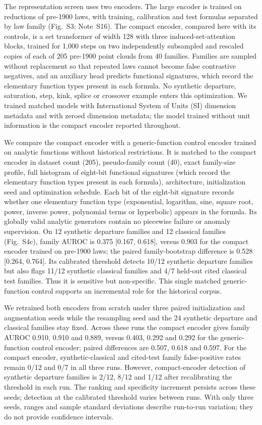 \documentclass{article}
\begin{document}
The representation screen uses two encoders. The large encoder is trained on reductions of pre-1900 laws, with training, calibration and test formulas separated by law family (Fig.~S3; Note~S16). The compact encoder, compared here with its controls, is a set transformer of width 128 with three induced-set-attention blocks, trained for 1,000 steps on two independently subsampled and rescaled copies of each of 205 pre-1900 point clouds from 40 families. Families are sampled without replacement so that repeated laws cannot become false contrastive negatives, and an auxiliary head predicts functional signatures, which record the elementary function types present in each formula. No synthetic departure, saturation, step, kink, splice or crossover example enters this optimization. We trained matched models with International System of Units (SI) dimension metadata and with zeroed dimension metadata; the model trained without unit information is the compact encoder reported throughout.

We compare the compact encoder with a generic-function control encoder trained on analytic functions without historical restrictions. It is matched to the compact encoder in dataset count (205), pseudo-family count (40), exact family-size profile, full histogram of eight-bit functional signatures (which record the elementary function types present in each formula), architecture, initialization seed and optimization schedule. Each bit of the eight-bit signature records whether one elementary function type (exponential, logarithm, sine, square root, power, inverse power, polynomial terms or hyperbolic) appears in the formula. Its globally valid analytic generators contain no piecewise failure or anomaly supervision. On 12 synthetic departure families and 12 classical families (Fig.~S4c), family AUROC is 0.375 [0.167, 0.618], versus 0.903 for the compact encoder trained on pre-1900 laws; the paired family-bootstrap difference is 0.528 [0.264, 0.764]. Its calibrated threshold detects 10/12 synthetic departure families but also flags 11/12 synthetic classical families and 4/7 held-out cited classical test families. Thus it is sensitive but non-specific. This single matched generic-function control supports an incremental role for the historical corpus.

We retrained both encoders from scratch under three paired initialization and augmentation seeds while the resampling seed and the 24 synthetic departure and classical families stay fixed. Across these runs the compact encoder gives family AUROC 0.910, 0.910 and 0.889, versus 0.403, 0.292 and 0.292 for the generic-function control encoder; paired differences are 0.507, 0.618 and 0.597. For the compact encoder, synthetic-classical and cited-test family false-positive rates remain 0/12 and 0/7 in all three runs. However, compact-encoder detection of synthetic departure families is 2/12, 8/12 and 1/12 after recalibrating the threshold in each run. The ranking and specificity increment persists across these seeds; detection at the calibrated threshold varies between runs. With only three seeds, ranges and sample standard deviations describe run-to-run variation; they do not provide confidence intervals.
\end{document}
